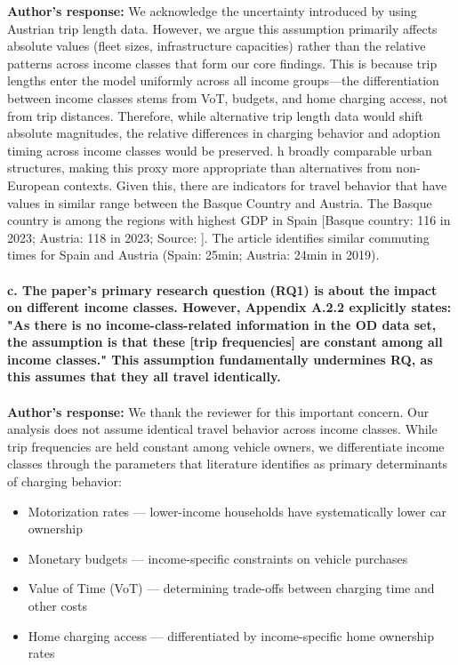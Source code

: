 \documentclass[11pt]{article}
\begin{document}
\color{authorblue}
\noindent \textcolor{authorblue}{\textbf{Author's response:}} We acknowledge the uncertainty introduced by using Austrian trip length data. However, we argue this assumption primarily affects absolute values (fleet sizes, infrastructure capacities) rather than the relative patterns across income classes that form our core findings. This is because trip lengths enter the model uniformly across all income groups—the differentiation between income classes stems from VoT, budgets, and home charging access, not from trip distances. Therefore, while alternative trip length data would shift absolute magnitudes, the relative differences in charging behavior and adoption timing across income classes would be preserved. h broadly comparable urban structures, making this proxy more appropriate than alternatives from non-European contexts. Given this, there are indicators for travel behavior that have values in similar range between the Basque Country and Austria. The Basque country is among the regions with highest GDP in Spain [Basque country: 116 in 2023; Austria: 118 in 2023; Source: \citep{eustat_gdp_ppp_2025}]. The article \citep{eurostat_commuting_2019} identifies similar commuting times for Spain and Austria (Spain: 25min; Austria: 24min in 2019). \\ \\

\color{reviewergrey}
\textbf{c. The paper's primary research question (RQ1) is about the impact on different income classes. However, Appendix A.2.2 explicitly states: "As there is no income-class-related information in the OD data set, the assumption is that these [trip frequencies] are constant among all income classes." This assumption fundamentally undermines RQ, as this assumes that they all travel identically.}\\\\
\color{authorblue}
\noindent \textcolor{authorblue}{\textbf{Author's response:}} 
We thank the reviewer for this important concern. Our analysis does not assume identical travel behavior across income classes. While trip frequencies are held constant among vehicle owners, we differentiate income classes through the parameters that literature identifies as primary determinants of charging behavior:
\begin{itemize}
    \item Motorization rates — lower-income households have systematically lower car ownership
    \item Monetary budgets — income-specific constraints on vehicle purchases
    \item Value of Time (VoT) — determining trade-offs between charging time and other costs
    \item Home charging access — differentiated by income-specific home ownership rates
\end{itemize}
\end{document}
